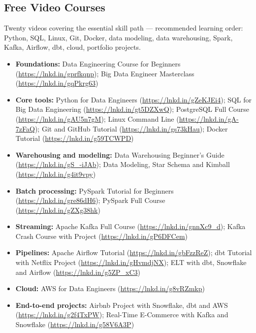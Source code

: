 \subsection*{Free Video Courses}
Twenty videos covering the essential skill path --- recommended learning order: Python, SQL, Linux, Git, Docker, data modeling, data warehousing, Spark, Kafka, Airflow, dbt, cloud, portfolio projects.
\begin{itemize}
    \item \textbf{Foundations:} Data Engineering Course for Beginners (\url{https://lnkd.in/gprfkqnp}); Big Data Engineer Masterclass (\url{https://lnkd.in/gqPkrg63})
    \item \textbf{Core tools:} Python for Data Engineers (\url{https://lnkd.in/gZeKJEi4}); SQL for Big Data Engineering (\url{https://lnkd.in/gt5DZXwQ}); PostgreSQL Full Course (\url{https://lnkd.in/gAU5n7gM}); Linux Command Line (\url{https://lnkd.in/gA-7zFaQ}); Git and GitHub Tutorial (\url{https://lnkd.in/gs73kHau}); Docker Tutorial (\url{https://lnkd.in/g59TCWPD})
    \item \textbf{Warehousing and modeling:} Data Warehousing Beginner's Guide (\url{https://lnkd.in/gS_-iJAb}); Data Modeling, Star Schema and Kimball (\url{https://lnkd.in/g4it9vpy})
    \item \textbf{Batch processing:} PySpark Tutorial for Beginners (\url{https://lnkd.in/gre86dH6}); PySpark Full Course (\url{https://lnkd.in/gZXg38hk})
    \item \textbf{Streaming:} Apache Kafka Full Course (\url{https://lnkd.in/gnnXc9_d}); Kafka Crash Course with Project (\url{https://lnkd.in/gP6DFCem})
    \item \textbf{Pipelines:} Apache Airflow Tutorial (\url{https://lnkd.in/gbFzzReZ}); dbt Tutorial with Netflix Project (\url{https://lnkd.in/gHvmdjNX}); ELT with dbt, Snowflake and Airflow (\url{https://lnkd.in/g5ZP_xC3})
    \item \textbf{Cloud:} AWS for Data Engineers (\url{https://lnkd.in/g8vRZmkp})
    \item \textbf{End-to-end projects:} Airbnb Project with Snowflake, dbt and AWS (\url{https://lnkd.in/g2f4TxPW}); Real-Time E-Commerce with Kafka and Snowflake (\url{https://lnkd.in/g58V6A3P})
\end{itemize}

